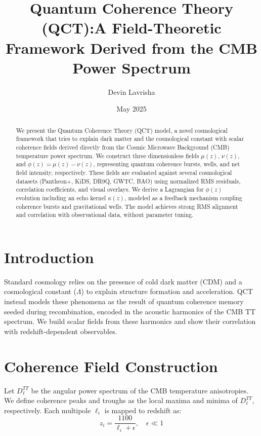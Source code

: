 \documentclass[12pt]{article}
\title{Quantum Coherence Theory (QCT):\newline A Field-Theoretic Framework Derived from the CMB Power Spectrum}
\author[1]{Devin Lavrisha}
\affil[1]{Independent Researcher}
\date{May 2025}
\begin{document}
	
	\maketitle
	
	\begin{abstract}
		We present the Quantum Coherence Theory (QCT) model, a novel cosmological framework that tries to explain dark matter and the cosmological constant with scalar coherence fields derived directly from the Cosmic Microwave Background (CMB) temperature power spectrum. We construct three dimensionless fields \( \mu(z) \), \( \nu(z) \), and \( \phi(z) = \mu(z) - \nu(z) \), representing quantum coherence bursts, wells, and net field intensity, respectively. These fields are evaluated against several cosmological datasets (Pantheon+, KiDS, DR9Q, GWTC, BAO) using normalized RMS residuals, correlation coefficients, and visual overlays. We derive a Lagrangian for \( \phi(z) \) evolution including an echo kernel \( \kappa(z) \), modeled as a feedback mechanism coupling coherence bursts and gravitational wells. The model achieves strong RMS alignment and correlation with observational data, without parameter tuning.
	\end{abstract}
	
	\section{Introduction}
	Standard cosmology relies on the presence of cold dark matter (CDM) and a cosmological constant (\( \Lambda \)) to explain structure formation and acceleration. QCT instead models these phenomena as the result of quantum coherence memory seeded during recombination, encoded in the acoustic harmonics of the CMB TT spectrum. We build scalar fields from these harmonics and show their correlation with redshift-dependent observables.
	
	\section{Coherence Field Construction}
	Let \( D_\ell^{TT} \) be the angular power spectrum of the CMB temperature anisotropies. We define coherence peaks and troughs as the local maxima and minima of \( D_\ell^{TT} \), respectively. Each multipole \( \ell_i \) is mapped to redshift as:
	\begin{equation}
		z_i = \frac{1100}{\ell_i + \epsilon}, \quad \epsilon \ll 1
	\end{equation}
	
\end{document}
